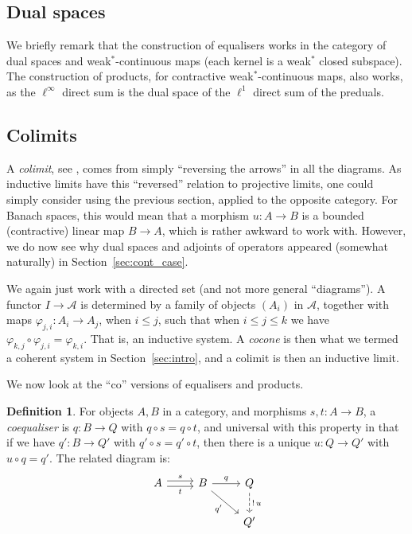 \documentclass[a4paper,11pt]{article}
\newcommand{\mc}[1]{{\mathcal{#1}}}
\theoremstyle{definition}
\newtheorem{definition}[lemma]{Definition}
\begin{document}
\subsection{Dual spaces}

We briefly remark that the construction of equalisers works in the category of dual spaces and weak$^*$-continuous maps (each kernel is a weak$^*$ closed subspace).  The construction of products, for contractive weak$^*$-continuous maps, also works, as the $\ell^\infty$ direct sum is the dual space of the $\ell^1$ direct sum of the preduals.


\subsection{Colimits}

A \emph{colimit}, see \cite[Section~5.2]{leinster}, comes from simply ``reversing the arrows'' in all the diagrams.  As inductive limits have this ``reversed'' relation to projective limits, one could simply consider using the previous section, applied to the opposite category.  For Banach spaces, this would mean that a morphism $u\colon A\to B$ is a bounded (contractive) linear map $B\to A$, which is rather awkward to work with.  However, we do now see why dual spaces and adjoints of operators appeared (somewhat naturally) in Section~\ref{sec:cont_case}.

We again just work with a directed set (and not more general ``diagrams'').  A functor $I\to \mc A$ is determined by a family of objects $(A_i)$ in $\mc A$, together with maps $\varphi_{j,i} \colon A_i \to A_j$, when $i\leq j$, such that when $i\leq j\leq k$ we have $\varphi_{k,j}\circ\varphi_{j,i} = \varphi_{k,i}$.  That is, an inductive system.  A \emph{cocone} is then what we termed a coherent system in Section~\ref{sec:intro}, and a colimit is then an inductive limit.

We now look at the ``co'' versions of equalisers and products.

\begin{definition}
For objects $A,B$ in a category, and morphisms $s,t\colon A\to B$, a \emph{coequaliser} is $q\colon B\to Q$ with $q\circ s=q\circ t$, and universal with this property in that if we have $q'\colon B\to Q'$ with $q'\circ s=q'\circ t$, then there is a unique $u\colon Q\to Q'$ with $u\circ q = q'$.  The related diagram is:
\[\begin{tikzcd}
    A \arrow[r, "s", shift left] \arrow[r, "t"', shift right]  & B \arrow[r, "q"] \arrow[rd, "q'"'] & Q \arrow[d, dashed, "!\, u"]\\
    && Q'
\end{tikzcd}\]
\end{definition}
\end{document}
